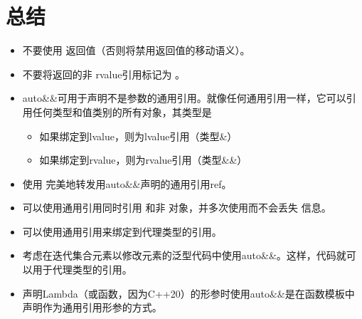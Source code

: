 \section{总结}
\begin{itemize}
	\item 不要使用  返回值（否则将禁用返回值的移动语义）。
	\item 不要将返回的非  rvalue引用标记为 。
	\item auto\&\&可用于声明不是参数的通用引用。就像任何通用引用一样，它可以引用任何类型和值类别的所有对象，其类型是
	\begin{itemize}
		\item 如果绑定到lvalue，则为lvalue引用（类型\&）
		\item 如果绑定到rvalue，则为rvalue引用（类型\&\&）
	\end{itemize}
	\item 使用  完美地转发用auto\&\&声明的通用引用ref。
	\item 可以使用通用引用同时引用  和非  对象，并多次使用而不会丢失  信息。
	\item 可以使用通用引用来绑定到代理类型的引用。
	\item 考虑在迭代集合元素以修改元素的泛型代码中使用auto\&\&。这样，代码就可以用于代理类型的引用。
	\item 声明Lambda（或函数，因为C++20）的形参时使用auto\&\&是在函数模板中声明作为通用引用形参的方式。
\end{itemize}


